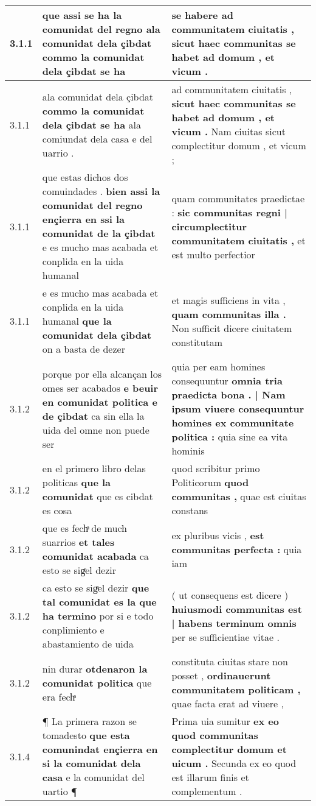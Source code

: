 \begin{tabular}{|p{1cm}|p{6.5cm}|p{6.5cm}|}
3.1.1 & que assi se ha la comunidat del regno \textbf{ ala comunidat dela çibdat } commo la comunidat dela çibdat se ha & se habere \textbf{ ad communitatem ciuitatis , } sicut haec communitas se habet ad domum , et vicum . \\\hline
3.1.1 & ala comunidat dela çibdat \textbf{ commo la comunidat dela çibdat se ha } ala comiundat dela casa e del uarrio . & ad communitatem ciuitatis , \textbf{ sicut haec communitas se habet ad domum , et vicum . } Nam ciuitas sicut complectitur domum , et vicum ; \\\hline
3.1.1 & que estas dichos dos comuindades . \textbf{ bien assi la comunidat del regno ençierra en ssi la comunidat de la çibdat } e es mucho mas acabada et conplida en la uida humanal & quam communitates praedictae : \textbf{ sic communitas regni | circumplectitur communitatem ciuitatis , } et est multo perfectior \\\hline
3.1.1 & e es mucho mas acabada et conplida en la uida humanal \textbf{ que la comunidat dela çibdat } on a basta de dezer & et magis sufficiens in vita , \textbf{ quam communitas illa . } Non sufficit dicere ciuitatem constitutam \\\hline
3.1.2 & porque por ella alcançan los omes ser acabados \textbf{ e beuir en comunidat politica e de çibdat } ca sin ella la uida del omne non puede ser & quia per eam homines consequuntur \textbf{ omnia tria praedicta bona . | Nam ipsum viuere consequuntur homines ex communitate politica : } quia sine ea vita hominis \\\hline
3.1.2 & en el primero libro delas politicas \textbf{ que la comunidat } que es cibdat es cosa & quod scribitur primo Politicorum \textbf{ quod communitas , } quae est ciuitas constans \\\hline
3.1.2 & que es fechͣ de much suarrios \textbf{ et tales comunidat acabada } ca esto se sigͤel dezir & ex pluribus vicis , \textbf{ est communitas perfecta : } quia iam \\\hline
3.1.2 & ca esto se sigͤel dezir \textbf{ que tal comunidat es la que ha termino } por si e todo conplimiento e abastamiento de uida & ( ut consequens est dicere ) \textbf{ huiusmodi communitas est | habens terminum omnis } per se sufficientiae vitae . \\\hline
3.1.2 & nin durar \textbf{ otdenaron la comunidat politica } que era fechͣ & constituta ciuitas stare non posset , \textbf{ ordinauerunt communitatem politicam , } quae facta erat ad viuere , \\\hline
3.1.4 & ¶ La primera razon se tomadesto \textbf{ que esta comunindat ençierra en si la comunidat dela casa } e la comunidat del uartio ¶ & Prima uia sumitur \textbf{ ex eo quod communitas complectitur domum et uicum . } Secunda ex eo quod est illarum finis et complementum . \\\hline

\end{tabular}
